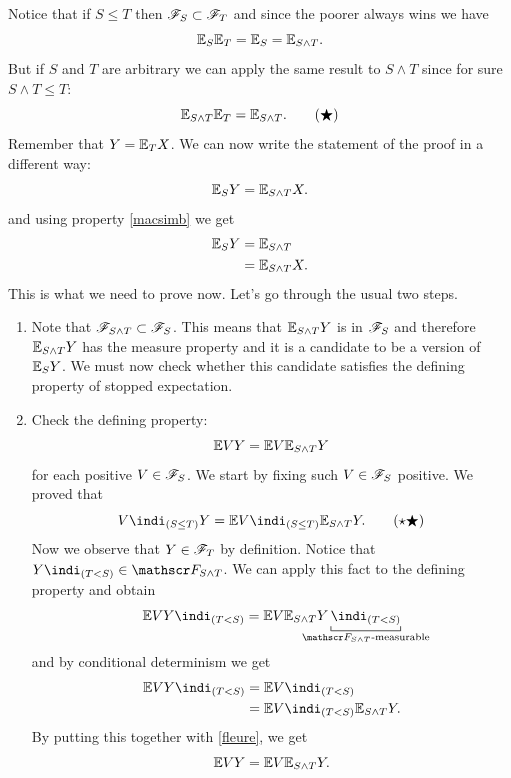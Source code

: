 \documentclass{report}
\begin{document}
\begin{fancyproof}
	Notice that if $S\leq T$ then $\mathscr{F}_{S}\subset\mathscr{F}_{T}$ and since the poorer \sa{} always wins we have
	\begin{equation*}
		\mathbb{E}_{S}\mathbb{E}_{T}=\mathbb{E}_{S}=\mathbb{E}_{S\wedge T}.
	\end{equation*}
	But if $S$ and $T$ are arbitrary we can apply the same result to $S\wedge T$ since for sure $S\wedge T\leq T$:
	\begin{equation}
		\mathbb{E}_{S\wedge T}\mathbb{E}_{T}=\mathbb{E}_{S\wedge T}.\tag{$\bigstar$}\label{macsimb}
	\end{equation}
	Remember that $Y=\mathbb{E}_{T}X$. We can now write the statement of the proof in a different way:
	\begin{equation*}
		\mathbb{E}_{S}Y=\mathbb{E}_{S\wedge T}X.
	\end{equation*}
	and using property \ref{macsimb} we get
	\begin{align*}
		\mathbb{E}_{S}Y&=\mathbb{E}_{S\wedge T}\\
		&=\mathbb{E}_{S\wedge T} X.
	\end{align*}
	This is what we need to prove now. Let's go through the usual two steps.
	\begin{enumerate}
		\item Note that $\mathscr{F}_{S\wedge T}\subset\mathscr{F}_{S}$. This means that $\mathbb{E}_{S\wedge T}Y$ is in $\mathscr{F}_{S}$ and therefore $\mathbb{E}_{S\wedge T}Y$ has the measure property and it is a candidate to be a version of $\mathbb{E}_{S} Y$. We must now check whether this candidate satisfies the defining property of stopped expectation.
		\item Check the defining property:
		\begin{equation*}
			\mathbb{E} VY=\mathbb{E} V\mathbb{E}_{S\wedge T}Y
		\end{equation*}
		for each positive $V\in\mathscr{F}_{S}$. We start by fixing such $V\in\mathscr{F}_{S}$ positive. We proved that
		\begin{equation*}
			V\indi_{(S\leq T)}Y=\ev V\indi_{(S\leq T)}\ev_{S\wedge T}Y.\tag{$\star\bigstar$}\label{fleure}
		\end{equation*}
		Now we observe that $Y\in\mathscr{F}_{T}$ by definition. Notice that $Y\indi_{(T<S)}\in\F_{S\wedge T}$. We can apply this fact to the defining property and obtain
		\begin{equation*}
			\ev VY\indi_{(T<S)}=\ev V\ev_{S\wedge T}Y\underbracket[0.5pt]{\indi_{(T<S)}}_{\mathclap{\text{$\F_{S\wedge T}$-measurable}}}
		\end{equation*}
		and by conditional determinism we get
		\begin{align*}
			\ev VY\indi_{(T<S)}&=\ev V\indi_{(T<S)}\\
			&=\ev V\indi_{(T<S)}\ev_{S\wedge T}Y.
		\end{align*}
		By putting this together with \ref{fleure}, we get
		\begin{equation*}
			\mathbb{E} VY=\mathbb{E} V\mathbb{E}_{S\wedge T}Y.
		\end{equation*}
	\end{enumerate}
\end{fancyproof}
\end{document}
